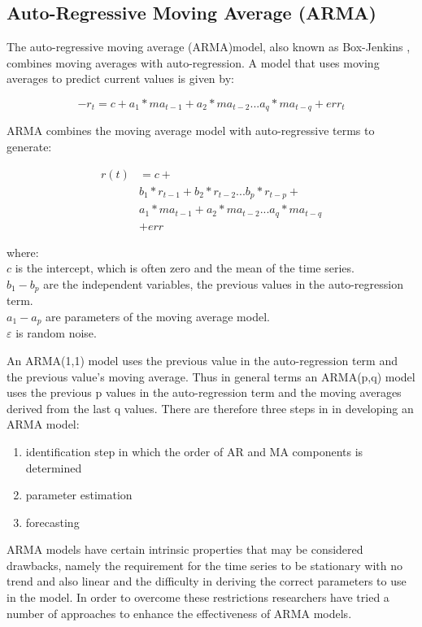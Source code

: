 \subsection{Auto-Regressive Moving Average (ARMA)}
\label{sec:arma}
The auto-regressive moving average (ARMA)model, also known as Box-Jenkins \citep{box1970time}, combines moving averages with auto-regression. A model that uses moving averages to predict current values is given by:

\[ -r_{t}=c+a_{1}*ma_{t-1}+a_{2}*ma_{t-2}...a_{q}*ma_{t-q}+err_{t}\]

ARMA combines the moving average model with auto-regressive terms to generate:


\begin{align*}
	r(t) & =   c+ \\
    	 & b_{1}*r_{t-1}+b_{2}*r_{t-2}...b_{p}*r_{t-p}+ \\ 
      	 & a_{1}*ma_{t-1}+a_{2}*ma_{t-2}...a_{q}*ma_{t-q} \\
    	 & +err
\end{align*}

where:\\
$ c $ is the intercept, which is often zero and the mean of the time series. \\
$ b_{1}-b_{p} $ are the independent variables, the previous values in the auto-regression term.\\
$ a_{1}-a_{p} $ are parameters of the moving average model.\\
$ \varepsilon $ is random noise.

An ARMA(1,1) model uses the previous value in the auto-regression term and the previous value's moving average. Thus in general terms an ARMA(p,q) model uses the previous p values in the auto-regression term and the moving averages derived from the last q values. There are therefore three steps in in developing an ARMA model:
\begin{enumerate}
\item identification step in which the order of AR and MA components is determined
\item parameter estimation
\item forecasting
\end{enumerate}

ARMA models have certain intrinsic properties that may be considered drawbacks, namely the requirement for the time series to be stationary with no trend and also linear and the difficulty in deriving the correct parameters to use in the model. In order to overcome these restrictions researchers have tried a number of approaches to enhance the effectiveness of ARMA models.


